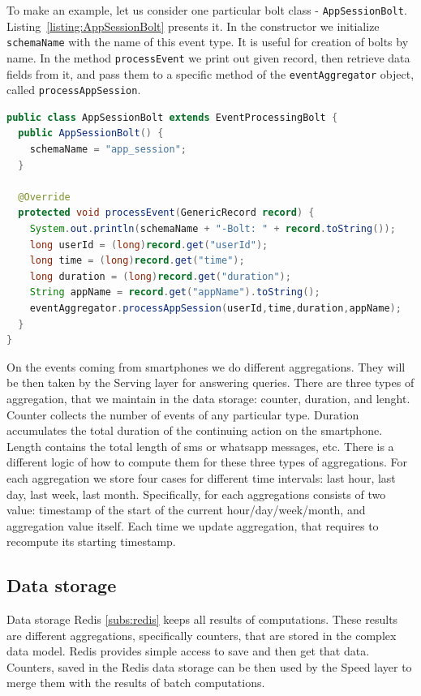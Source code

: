 To make an example, let us consider one particular bolt class - \lstinline{AppSessionBolt}.
Listing~\ref{listing:AppSessionBolt} presents it.
In the constructor we initialize \lstinline{schemaName} with the name of this event type.
It is useful for creation of bolts by name.
In the method \lstinline{processEvent} we print out given record, then retrieve data fields from it, and pass them to a specific method of the \lstinline{eventAggregator} object, called \lstinline{processAppSession}.

\begin{lstlisting}[float=h, caption=Implementation of AppSessionBolt class., label=listing:AppSessionBolt, language=Java]
public class AppSessionBolt extends EventProcessingBolt {
  public AppSessionBolt() {
    schemaName = "app_session";
  }

  @Override
  protected void processEvent(GenericRecord record) {
    System.out.println(schemaName + "-Bolt: " + record.toString());
    long userId = (long)record.get("userId");
    long time = (long)record.get("time");
    long duration = (long)record.get("duration");
    String appName = record.get("appName").toString();
    eventAggregator.processAppSession(userId,time,duration,appName);
  }
}
\end{lstlisting}

On the events coming from smartphones we do different aggregations.
They will be then taken by the Serving layer for answering queries.
There are three types of aggregation, that we maintain in the data storage: counter, duration, and lenght.
Counter collects the number of events of any particular type.
Duration accumulates the total duration of the continuing action on the smartphone.
Length contains the total length of sms or whatsapp messages, etc.
There is a different logic of how to compute them for these three types of aggregations. 
For each aggregation we store four cases for different time intervals: last hour, last day, last week, last month.
Specifically, for each aggregations consists of two value: timestamp of the start of the current hour/day/week/month, and aggregation value itself.
Each time we update aggregation, that requires to recompute its starting timestamp.

\subsection{Data storage}

Data storage Redis \ref{subs:redis} keeps all results of computations.
These results are different aggregations, specifically counters, that are stored in the complex data model.
Redis provides simple access to save and then get that data.
Counters, saved in the Redis data storage can be then used by the Speed layer to merge them with the results of batch computations.

